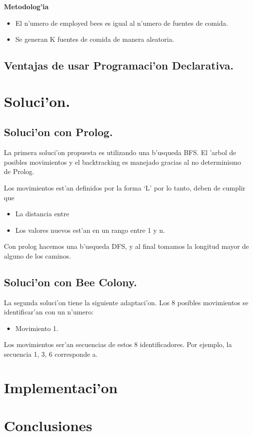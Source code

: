 \documentclass[11pt]{article}
\begin{document}
    \textbf{Metodolog'ia}
    \begin{itemize}
        \item El n'umero de employed bees es igual al n'umero de fuentes de comida.
        \item Se generan K fuentes de comida de manera aleatoria.
    \end{itemize}


    \subsection{Ventajas de usar Programaci'on Declarativa.}

    \section{Soluci'on.}

    \subsection{Soluci'on con Prolog.}
    La primera soluci'on propuesta es utilizando una b'usqueda BFS.
    El 'arbol de posibles movimientos y el backtracking es manejado
    gracias al no determinismo de Prolog.

    Los movimientos est'an definidos por la forma `L' \; por lo tanto, deben de cumplir
    que
    \begin{itemize}
        \item La distancia entre
        \item Los valores nuevos est'an en un rango entre 1 y n.
    \end{itemize}

    Con prolog hacemos una b'usqueda DFS, y al final tomamos
    la longitud mayor de alguno de los caminos.

    \subsection{Soluci'on con Bee Colony.}

    La segunda soluci'on tiene la siguiente adaptaci'on.
    Los 8 posibles movimientos se identificar'an con un n'umero:
    \begin{itemize}
        \item Movimiento 1.
    \end{itemize}

    Los movimientos ser'an secuencias de estos 8 identificadores.
    Por ejemplo, la secuencia 1, 3, 6 corresponde a.
    \section{Implementaci'on}
    
    \section{Conclusiones}
\end{document}
